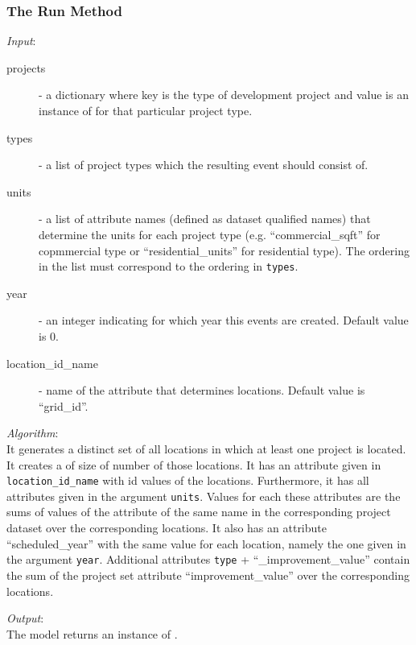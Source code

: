 %
\subsubsection{The Run Method}
%
{\it Input}:
\begin{description}
\item[projects] - a dictionary where key is the type of development
  project and value is an instance of  for that
  particular project type.
\item[types] - a list of project types which the resulting event should
  consist of.
\item[units] - a list of attribute \attributesindex names (defined as dataset \datasetindex qualified names)
  that determine the units for each project type (e.g. ``commercial_sqft'' for
  copmmercial type or ``residential_units'' for residential type). The
  ordering in the list must correspond to the ordering in \verb|types|.
\item[year] - an integer indicating for which year this events are
  created. Default value is 0.
\item[location_id_name] - name of the attribute \attributesindex that determines
  locations. Default value is ``grid_id''.
\end{description}

{\it Algorithm}:\\[1mm]
It generates a distinct set of all locations in which at least one project is
located. It creates a  of size of number of those
locations. It has an attribute \attributesindex given in \verb|location_id_name| with id values
of the locations. Furthermore, it has all attributes \attributesindex given in the argument
\verb|units|. Values for each these attributes \attributesindex are the sums of values of the
attribute \attributesindex of the same name in the corresponding project dataset \datasetindex over the
corresponding locations. It also has an attribute \attributesindex ``scheduled_year'' with the
same value for each location, namely the one given in the argument
\verb|year|. Additional attributes \attributesindex \verb|type| + ``_improvement_value''
contain the sum of the project set attribute \attributesindex ``improvement_value'' over the
corresponding locations.

{\it Output}:~\\[1mm]
The model \modelsindex returns an instance of .

